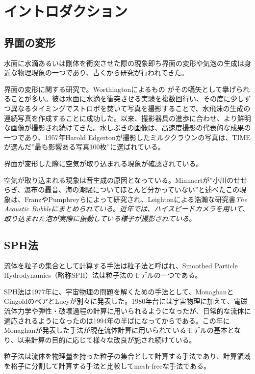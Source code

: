 \documentclass[]{jsarticle}
\begin{document}
\section{イントロダクション}
\subsection{界面の変形}
水面に水滴あるいは剛体を衝突させた際の現象即ち界面の変形や気泡の生成は身近な物理現象の一つであり、古くから研究が行われてきた。

界面の変形に関する研究で。Worthingtonによるもの \cite{worthington1908}がその嚆矢として擧げられることが多い。彼は水面に水滴を衝突させる実験を複数回行い、その度に少しずつ異なるタイミングでストロボを焚いて写真を撮影することで、水飛沫の生成の連続写真を作成することに成功した。以来、撮影器具の進歩に合わせ、より鮮明な画像が撮影され続けてきた。水しぶきの画像は、高速度撮影の代表的な成果の一つであり、1957年Harold Edgertonが撮影したミルククラウンの写真は、TIMEが選んだ”最も影響ある写真100枚”に選ばれている。

界面が変形した際に空気が取り込まれる現象が確認されている。

空気が取り込まれる現象は音生成の原因となっている。Minnaert\cite{minnaert1933xvi}が”小川のせせらぎ、瀑布の轟音、海の潮騒についてほとんど分かっていない”と述べたこの現象は、Franz\cite{Franz1959}やPumphrey\cite{Pumphrey1990}らによって研究され、Leightonによる浩瀚な研究書\it{The Acoustic Bubble}\cite{leightonacoustic}にまとめられている。近年では、ハイスピードカメラを用いて、取り込まれた泡が実際に振動している様子が撮影されている\cite{Phillips2018}。

\subsection{SPH法}
流体を粒子の集合として計算する手法は粒子法と呼ばれ、\rm{Smoothed Particle Hydrodynamics}（略称SPH）法は粒子法のモデルの一つである。

SPH法は1977年に、宇宙物理の問題を解くための手法として、MonaghanとGingold\cite{Gingold1977}のペアとLucy\cite{Lucy1977}が別々に発表した。1980年台には宇宙物理に加えて、電磁流体力学や弾性・破壊過程の計算に用いられるようになったが、日常的な流体に適応されるようになったのは1994年の半ばになってからである。この年にMonaghan\cite{Monaghan1994}が発表した手法が現在流体計算に用いられているモデルの基本となり、以来計算の目的に応じて様々な改良が施され続けている。

粒子法は流体を物理量を持った粒子の集合として計算する手法であり、計算領域を格子に分割して計算する手法と比較してmesh-freeな手法である。
\label{subsec:label}




\end{document}
